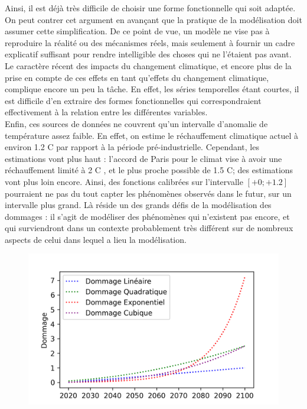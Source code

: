 Ainsi, il est déjà très difficile de choisir une forme fonctionnelle qui soit adaptée. On peut contrer cet argument en avançant que la pratique de la modélisation doit assumer cette simplification. De ce point de vue, un modèle ne vise pas à reproduire la réalité ou des mécanismes réels, mais seulement à fournir un cadre explicatif suffisant pour rendre intelligible des choses qui ne l'étaient pas avant. \\

Le caractère récent des impacts du changement climatique, et encore plus de la prise en compte de ces effets en tant qu'effets du changement climatique, complique encore un peu la tâche. En effet, les séries temporelles étant courtes, il est difficile d'en extraire des formes fonctionnelles qui correspondraient effectivement à la relation entre les différentes variables. \\

Enfin, ces sources de données ne couvrent qu'un intervalle d'anomalie de température assez faible. En effet, on estime le réchauffement climatique actuel à environ 1.2 \textdegree C par rapport à la période pré-industrielle. Cependant, les estimations vont plus haut : l'accord de Paris pour le climat vise à avoir une réchauffement limité à 2 \textdegree C , et le plus proche possible de 1.5 \textdegree C; des estimations vont plus loin encore. Ainsi, des fonctions calibrées sur l'intervalle $[+0; +1.2]$ pourraient ne pas du tout capter les phénomènes observés dans le futur, sur un intervalle plus grand. Là réside un des grands défis de la modélisation des dommages : il s'agit de modéliser des phénomènes qui n'existent pas encore, et qui surviendront dans un contexte probablement très différent sur de nombreux aspects de celui dans lequel a lieu la modélisation. 

\begin{figure}[ht]
\centering
\includegraphics[width=\textwidth]{results/shape.png}
\end{figure}



